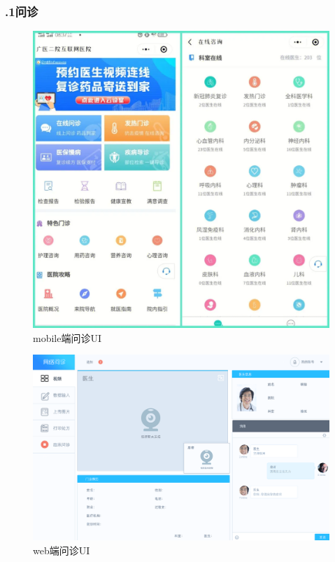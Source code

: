 \documentclass[24pt,a4paper]{article}%
\begin{document}
\subsubsection*{.1问诊}
\begin{figure}[H]
	\centering
	\includegraphics[width=1\textwidth]{./image/wenzhen-1.png}
	\caption*{mobile端问诊UI}
\end{figure}
\begin{figure}[H]
	\centering
	\includegraphics[width=1\textwidth]{./image/wenzhen-2.png}
	\caption*{web端问诊UI}
\end{figure}
\end{document}
